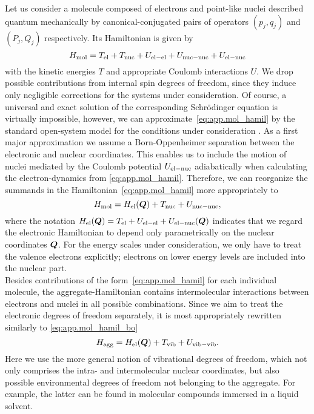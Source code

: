 %

Let us consider a molecule composed of electrons and point-like nuclei described quantum mechanically by canonical-conjugated pairs of operators $(p_j, q_j)$ and $(P_j, Q_j)$ respectively.
Its Hamiltonian is given by
\begin{equation}
  H_\mathrm{mol} = T_\mathrm{el} + T_\mathrm{nuc} + U_\mathrm{el-el} + U_\mathrm{nuc-nuc} + U_\mathrm{el-nuc}
  \label{eq:app.mol_hamil}
\end{equation}
with the kinetic energies $T$ and appropriate Coulomb interactions $U$.
We drop possible contributions from internal spin degrees of freedom, since they induce only negligible corrections for the systems under consideration.
Of course, a universal and exact solution of the corresponding Schrödinger equation is virtually impossible, however, we can approximate~\ref{eq:app.mol_hamil} by the standard open-system model for the conditions under consideration \cite{MaKu11_dynamics}.
As a first major approximation we assume a Born-Oppenheimer separation between the electronic and nuclear coordinates.
This enables us to include the motion of nuclei mediated by the Coulomb potential $U_\mathrm{el-nuc}$ adiabatically when calculating the electron-dynamics from \autoref{eq:app.mol_hamil}.
Therefore, we can reorganize the summands in the Hamiltonian~\ref{eq:app.mol_hamil} more appropriately to
\begin{equation}
  H_\mathrm{mol} = H_\mathrm{el}(\boldsymbol{Q}) + T_\mathrm{nuc} + U_\mathrm{nuc-nuc},
  \label{eq:app.mol_hamil_bo}
\end{equation}
where the notation $H_\mathrm{el}(\boldsymbol{Q}) = T_\mathrm{el} + U_\mathrm{el-el} + U_\mathrm{el-nuc}(\boldsymbol{Q})$ indicates that we regard the electronic Hamiltonian to depend only parametrically on the nuclear coordinates $\boldsymbol{Q}$.
For the energy scales under consideration, we only have to treat the valence electrons explicitly; electrons on lower energy levels are included into the  nuclear part.\\



Besides contributions of the form~\ref{eq:app.mol_hamil} for each individual molecule, the aggregate-Hamiltonian contains intermolecular interactions between electrons and nuclei in all possible combinations.
Since we aim to treat the electronic degrees of freedom separately, it is most appropriately rewritten similarly to \autoref{eq:app.mol_hamil_bo}
\begin{equation}
  H_\mathrm{agg} = H_\mathrm{el}(\boldsymbol{Q}) + T_\mathrm{vib} + U_\mathrm{vib-vib}.
  \label{eq:app.agg_hamil}
\end{equation}
Here we use the more general notion of vibrational degrees of freedom, which not only comprises the intra- and intermolecular nuclear coordinates, but also possible environmental degrees of freedom not belonging to the aggregate.
For example, the latter can be found in molecular compounds immersed in a liquid solvent.

